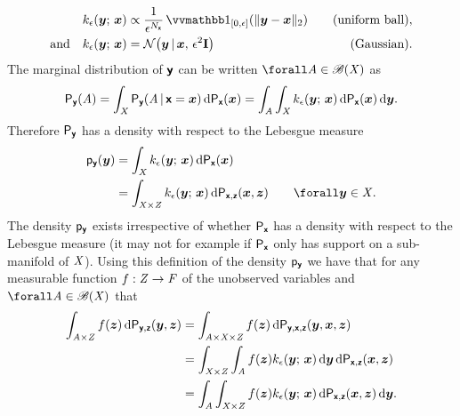 \begin{align}
\label{eq:uniform-ball-abc-kernel}
  k_\epsilon(\vct{y};\,\vct{x}) &\propto 
  \frac{1}{\epsilon^{N_{\rvct{x}}}} 
  \ind{[0,\epsilon]}\lpa\Vert\vct{y} - \vct{x}\Vert_2\rpa & 
  \quad \textrm{(uniform ball)},\\
\label{eq:gaussian-abc-kernel}
  \textrm{and}\quad
  k_\epsilon(\vct{y};\,\vct{x}) &= 
  \nrm{\vct{y}\gvn\vct{x},\,\epsilon^2\idmtx} &
  \quad \textrm{(Gaussian)}. 
\end{align}
The marginal distribution of $\boldsymbol{\mathsf{y}}$ can be written $\forall \set{A} \in \borel(\set{X})$ as
\begin{equation}
  \prob{\rvct{y}}(\set{A}) = 
  \int_{\set{X}} \prob{\rvct{y}}\lpa \set{A} \gvn \rvct{x}=\vct{x} \rpa
  \,\dr\prob{\rvct{x}}(\vct{x})
  =
  \int_{\set{A}} \int_{\set{X}}
    k_\epsilon(\vct{y};\,\vct{x})\,
  \dr\prob{\rvct{x}}(\vct{x})\,\dr\vct{y}.
\end{equation}
Therefore $\mathsf{P}_{\boldsymbol{\mathsf{y}}}$ has a density with respect to the Lebesgue measure
\begin{align}
  \pden{\rvct{y}}(\vct{y})
  &=
  \int_{\set{X}}
    k_\epsilon(\vct{y};\,\vct{x})\,
  \dr\prob{\rvct{x}}(\vct{x})
  \\
  &=
  \int_{\set{X}\times\set{Z}}
    k_\epsilon(\vct{y};\,\vct{x})\,
  \dr\prob{\rvct{x},\rvct{z}}(\vct{x},\vct{z})
  \qquad \forall \vct{y} \in \set{X}.
\end{align}
The density $\mathsf{p}_{\boldsymbol{\mathsf{y}}}$ exists irrespective of whether $\mathsf{P}_{\boldsymbol{\mathsf{x}}}$ has a density with respect to the Lebesgue measure (it may not for example if $\mathsf{P}_{\boldsymbol{\mathsf{x}}}$ only has support on a sub-manifold of $\mathit{X}$). Using this definition of the density $\mathsf{p}_{\boldsymbol{\mathsf{y}}}$ we have that for any measurable function $f : \mathit{Z} \to \mathit{F}$ of the unobserved variables and $\forall \set{A} \in \borel(\set{X})$ that
\begin{align}
  \label{eq:abc-conditional-expectation-derivation-1}
  \int_{\mathit{A} \times \mathit{Z}} 
    f(\boldsymbol{z}) 
  \,\mathrm{d}\mathsf{P}_{\boldsymbol{\mathsf{y}},\boldsymbol{\mathsf{z}}}(\boldsymbol{y},\boldsymbol{z}) 
  &=
  \int_{\mathit{A} \times \mathit{X} \times \mathit{Z}} 
    f(\boldsymbol{z}) 
  \,\mathrm{d}\mathsf{P}_{\boldsymbol{\mathsf{y}},\boldsymbol{\mathsf{x}},\boldsymbol{\mathsf{z}}}(\boldsymbol{y},\boldsymbol{x},\boldsymbol{z})
  \\
  \label{eq:abc-conditional-expectation-derivation-2}
  &=
  \int_{\mathit{X} \times \mathit{Z}} \int_{\mathit{A}}
    f(\boldsymbol{z})
    k_{\epsilon}(\boldsymbol{y};\,\boldsymbol{x})
  \,\mathrm{d}\boldsymbol{y}
  \,\mathrm{d}\mathsf{P}_{\boldsymbol{\mathsf{x}},\boldsymbol{\mathsf{z}}}(\boldsymbol{x},\boldsymbol{z})
  \\
  \label{eq:abc-conditional-expectation-derivation-3}
  &=
  \int_{\mathit{A}} \int_{\mathit{X} \times \mathit{Z}} 
    f(\boldsymbol{z})
    k_{\epsilon}(\boldsymbol{y};\,\boldsymbol{x})
  \,\mathrm{d}\mathsf{P}_{\boldsymbol{\mathsf{x}},\boldsymbol{\mathsf{z}}}(\boldsymbol{x},\boldsymbol{z})
 \,\mathrm{d}\boldsymbol{y}.
\end{align}
